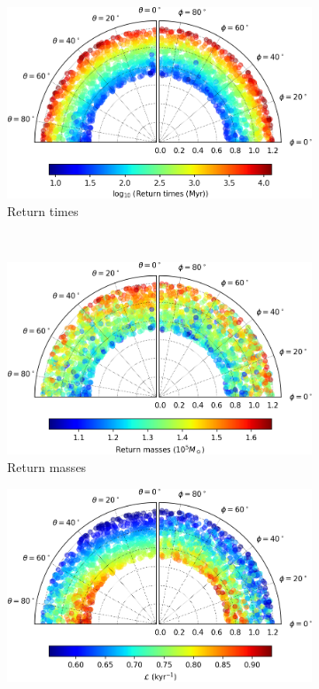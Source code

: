 \begin{figure}[h]
    \centering
    \begin{subfigure}[t]{0.4\textwidth}
        \includegraphics[width = \textwidth]{"../Files/Week 13/images/7_time"}
        \caption{Return times}
    \end{subfigure}
    ~ 
    \begin{subfigure}[t]{0.4\textwidth}
        \includegraphics[width=\textwidth]{"../Files/Week 13/images/7_mass"}
        \caption{Return masses}
    \end{subfigure}
    \begin{subfigure}[t]{0.4\textwidth}
        \includegraphics[width=\textwidth]{"../Files/Week 13/images/7_lyapunov"}

\end{subfigure}
\end{figure}
